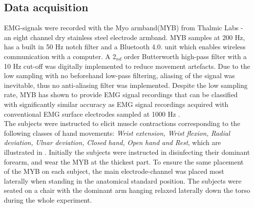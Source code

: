 \subsection{Data acquisition}
EMG-signals were recorded with the Myo armband(MYB) from Thalmic Labs - an eight channel dry stainless steel electrode armband. MYB samples at 200 Hz, has a built in 50 Hz notch filter and a Bluetooth 4.0. unit which enables wireless communication with a computer. A 2$_{nd}$ order Butterworth high-pass filter with a 10 Hz cut-off was digitally implemented to reduce movement artefacts. Due to the low sampling with no beforehand low-pass filtering, aliasing of the signal was inevitable, thus no anti-aliasing filter was implemented. Despite the low sampling rate, MYB has shown to provide EMG signal recordings that can be classified with significantly similar accuracy as EMG signal recordings acquired with conventional EMG surface electrodes sampled at 1000 Hz \cite{Mendez2017}. \\
The subjects were instructed to elicit muscle contractions corresponding to the following classes of hand movements: \textit{Wrist extension, Wrist flexion, Radial deviation, Ulnar deviation, Closed hand, Open hand and Rest}, which are illustrated in . Initially the subjects were instructed in disinfecting their dominant forearm, and wear the MYB at the thickest part. To ensure the same placement of the MYB on each subject, the main electrode-channel was placed most laterally when standing in the anatomical standard position. The subjects were seated on a chair with the dominant arm hanging relaxed laterally down the torso during the whole experiment. \\

